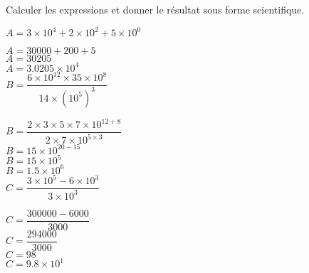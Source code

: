     Calculer les expressions et donner le résultat sous forme scientifique.
    \begin{spacing}{2}
        \begin{itemize}
            \def\item{}
            \item $A = 3\times 10^4 + 2\times 10^2 + 5\times 10^0$

            {\red
            $A = \num{30000} + 200 + 5$\\
            $A = \num{30205}$\\
            $A = \num{3.0205}\times 10^4$\\
            }
            \item $B=\dfrac{6\times 10^{12}\times 35 \times 10^8}{14\times \left(10^5\right)^3}$

            {\red
                $B=\dfrac{2\times 3\times 5\times 7\times 10^{12+8}}{2\times 7\times 10^{5\times 3}}$\\
                $B=15\times 10^{20-15}$\\
                $B=15\times 10^{5}$\\
                $B=\num{1.5}\times 10^{6}$\\
            }
            \item $C=\dfrac{3\times 10^{5} - 6 \times 10^3}{3\times 10^3}$

            {\red
                $C=\dfrac{\num{300000} - \num{6000}}{\num{3000}}$\\
                $C=\dfrac{\num{294000}}{\num{3000}}$\\
                $C=98$\\
                $C=\num{9.8}\times 10^1$\\
            }
        \end{itemize}
    \end{spacing}
    \Coupe
